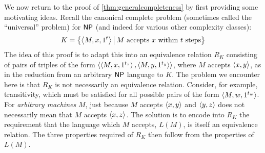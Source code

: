 We now return to the proof of \autoref{thm:generalcompleteness} by first providing some motivating ideas.
Recall the canonical complete problem (sometimes called the ``universal'' problem) for ${\mathsf{NP}}$ (and indeed for various other complexity classes):
\begin{displaymath}
  K = \left\{\left\langle M,x,1^t\right\rangle \, \middle| \, M\text{ accepts } x \text{ within } t \textnormal{ steps}\right\}
\end{displaymath}
The idea of this proof is to adapt this into an equivalence relation $R_K$ consisting of pairs of triples of the form $\langle\left\langle M,x,1^{t_x}\right\rangle,\left\langle M,y,1^{t_y}\right\rangle\rangle$, where $M$ accepts $\langle x,y\rangle$, as in the reduction from an arbitrary ${\mathsf{NP}}$ language to $K$.
The problem we encounter here is that $R_K$ is not necessarily an equivalence relation.
Consider, for example, transitivity, which must be satisfied for all possible pairs of the form $\left\langle M,w,1^{t_w}\right\rangle$.
For \emph{arbitrary machines} $M$, just because $M$ accepts $\langle x,y\rangle$ and $\langle y,z\rangle$ does not necessarily mean that $M$ accepts $\langle x,z\rangle$.
The solution is to encode into $R_K$ the requirement that the language which $M$ accepts, $L(M)$, is itself an equivalence relation.
The three properties required of $R_K$ then follow from the properties of $L(M)$.
%
%
